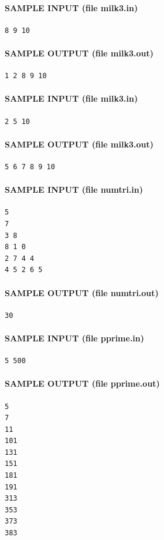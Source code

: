 \documentclass[11pt]{article}
\begin{document}
\paragraph{SAMPLE INPUT (file milk3.in)}
\begin{verbatim}
8 9 10
\end{verbatim}

\paragraph{SAMPLE OUTPUT (file milk3.out)}
\begin{verbatim}
1 2 8 9 10
\end{verbatim}

\paragraph{SAMPLE INPUT (file milk3.in)}
\begin{verbatim}
2 5 10
\end{verbatim}

\paragraph{SAMPLE OUTPUT (file milk3.out)}
\begin{verbatim}
5 6 7 8 9 10
\end{verbatim}

\paragraph{SAMPLE INPUT (file numtri.in)}
\begin{verbatim}
5
7
3 8
8 1 0
2 7 4 4
4 5 2 6 5
\end{verbatim}

\paragraph{SAMPLE OUTPUT (file numtri.out)}
\begin{verbatim}
30
\end{verbatim}

\paragraph{SAMPLE INPUT (file pprime.in)}
\begin{verbatim}
5 500
\end{verbatim}

\paragraph{SAMPLE OUTPUT (file pprime.out)}
\begin{verbatim}
5
7
11
101
131
151
181
191
313
353
373
383
\end{verbatim}
\end{document}
